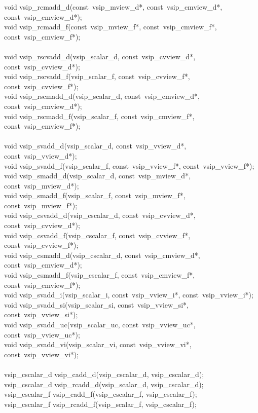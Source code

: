 \begin{cfuncs}
void vsip\_rcmadd\_d(const~vsip\_mview\_d*, const~vsip\_cmview\_d*, const~vsip\_cmview\_d*);\Bs\\
void vsip\_rcmadd\_f(const~vsip\_mview\_f*, const~vsip\_cmview\_f*, const~vsip\_cmview\_f*);\Bs\\
\\ \hline
void vsip\_rscvadd\_d(vsip\_scalar\_d, const~vsip\_cvview\_d*, const~vsip\_cvview\_d*);\Bs\\
void vsip\_rscvadd\_f(vsip\_scalar\_f, const~vsip\_cvview\_f*, const~vsip\_cvview\_f*);\Bs\\
void vsip\_rscmadd\_d(vsip\_scalar\_d, const~vsip\_cmview\_d*, const~vsip\_cmview\_d*);\Bs\\
void vsip\_rscmadd\_f(vsip\_scalar\_f, const~vsip\_cmview\_f*, const~vsip\_cmview\_f*);\Bs\\
\\ \hline
void vsip\_svadd\_d(vsip\_scalar\_d, const~vsip\_vview\_d*, const~vsip\_vview\_d*);\Bs\\
void vsip\_svadd\_f(vsip\_scalar\_f, const~vsip\_vview\_f*, const~vsip\_vview\_f*);\Bs\\
void vsip\_smadd\_d(vsip\_scalar\_d, const~vsip\_mview\_d*, const~vsip\_mview\_d*);\Bs\\
void vsip\_smadd\_f(vsip\_scalar\_f, const~vsip\_mview\_f*, const~vsip\_mview\_f*);\Bs\\
void vsip\_csvadd\_d(vsip\_cscalar\_d, const~vsip\_cvview\_d*, const~vsip\_cvview\_d*);\Bs\\
void vsip\_csvadd\_f(vsip\_cscalar\_f, const~vsip\_cvview\_f*, const~vsip\_cvview\_f*);\Bs\\
void vsip\_csmadd\_d(vsip\_cscalar\_d, const~vsip\_cmview\_d*, const~vsip\_cmview\_d*);\Bs\\
void vsip\_csmadd\_f(vsip\_cscalar\_f, const~vsip\_cmview\_f*, const~vsip\_cmview\_f*);\Bs\\
void vsip\_svadd\_i(vsip\_scalar\_i, const~vsip\_vview\_i*, const~vsip\_vview\_i*);\Bs\\
void vsip\_svadd\_si(vsip\_scalar\_si, const~vsip\_vview\_si*, const~vsip\_vview\_si*);\Bs\\
void vsip\_svadd\_uc(vsip\_scalar\_uc, const~vsip\_vview\_uc*, const~vsip\_vview\_uc*);\Bs\\
void vsip\_svadd\_vi(vsip\_scalar\_vi, const~vsip\_vview\_vi*, const~vsip\_vview\_vi*);\Bs\\
\\ \hline
vsip\_cscalar\_d vsip\_cadd\_d(vsip\_cscalar\_d, vsip\_cscalar\_d);\Bs\\
vsip\_cscalar\_d vsip\_rcadd\_d(vsip\_scalar\_d, vsip\_cscalar\_d);\Bs\\
vsip\_cscalar\_f vsip\_cadd\_f(vsip\_cscalar\_f, vsip\_cscalar\_f);\Bs\\
vsip\_cscalar\_f vsip\_rcadd\_f(vsip\_scalar\_f, vsip\_cscalar\_f);\Bs\\
\end{cfuncs}
